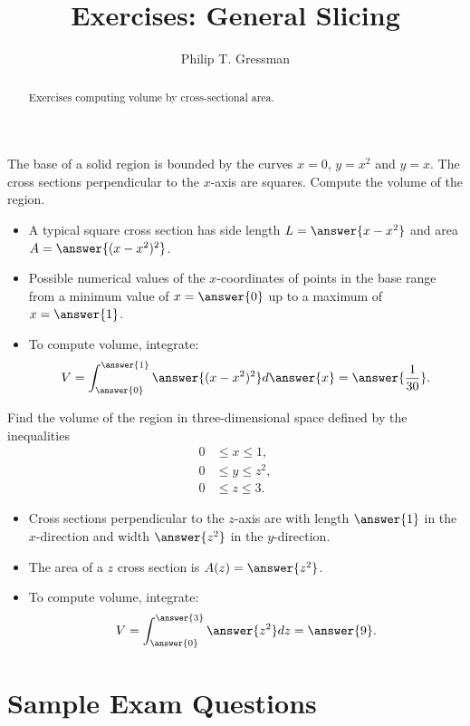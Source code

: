 \documentclass{ximera}
\title{Exercises: General Slicing}
\author{Philip T. Gressman}
\begin{document}
\begin{abstract}
Exercises computing volume by cross-sectional area.
\end{abstract}
\maketitle

\begin{exercise}
The base of a solid region is bounded by the curves $x = 0$, $y = x^2$ and $y = x$. The cross sections perpendicular to the $x$-axis are squares. Compute the volume of the region.
\begin{itemize}
\item A typical square cross section has side length $L = \answer{x - x^2}$ and area $A = \answer{(x-x^2)^2}$. 
\item Possible numerical values of the $x$-coordinates of points in the base range from a minimum value of $x = \answer{0}$ up to a maximum of $x = \answer{1}$.
\item To compute volume, integrate:
\[ V = \int_{\answer{0}}^{\answer{1}} \answer{(x-x^2)^2} d\answer{x} = \answer{\frac{1}{30}}. \]
\end{itemize}
\end{exercise}

\begin{exercise}
Find the volume of the region in three-dimensional space defined by the inequalities
\begin{align*}
0 & \leq x \leq 1, \\
0 & \leq y \leq z^2, \\
0 & \leq z \leq 3.
\end{align*}
\begin{itemize}
\item Cross sections perpendicular to the $z$-axis are  with length $\answer{1}$ in the $x$-direction and width $\answer{z^2}$ in the $y$-direction.
\item The area of a $z$ cross section is $A(z) = \answer{z^2}$.
\item To compute volume, integrate:
\[ V = \int_{\answer{0}}^{\answer{3}} \answer{z^2} dz = \answer{9}. \]
\end{itemize}
\end{exercise}

\section*{Sample Exam Questions}
\end{document}

